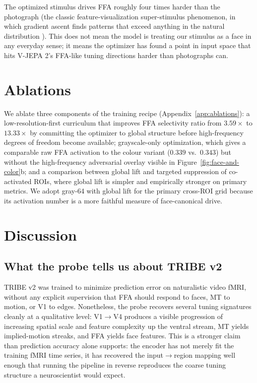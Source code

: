 \documentclass{article}
\begin{document}
The optimized stimulus drives FFA roughly four times harder than the photograph (the classic feature-visualization super-stimulus phenomenon, in which gradient ascent finds patterns that exceed anything in the natural distribution \citep{szegedy2013intriguing,goodfellow2014explaining,walker2019inception,bashivan2019neural}). This does not mean the model is treating our stimulus as a face in any everyday sense; it means the optimizer has found a point in input space that hits V-JEPA 2's FFA-like tuning directions harder than photographs can.

\section{Ablations}\label{sec:ablations}

We ablate three components of the training recipe (Appendix~\ref{app:ablations}): a low-resolution-first curriculum that improves FFA selectivity ratio from $3.59\times$ to $13.33\times$ by committing the optimizer to global structure before high-frequency degrees of freedom become available; grayscale-only optimization, which gives a comparable raw FFA activation to the colour variant ($0.339$ vs.\ $0.343$) but without the high-frequency adversarial overlay visible in Figure~\ref{fig:face-and-color}b; and a comparison between global lift and targeted suppression of co-activated ROIs, where global lift is simpler and empirically stronger on primary metrics. We adopt gray-64 with global lift for the primary cross-ROI grid because its activation number is a more faithful measure of face-canonical drive.

\section{Discussion}
\label{sec:discussion}

\subsection{What the probe tells us about TRIBE v2}
TRIBE v2 was trained to minimize prediction error on naturalistic video fMRI, without any explicit supervision that FFA should respond to faces, MT to motion, or V1 to edges. Nonetheless, the probe recovers several tuning signatures cleanly at a qualitative level: V1$\to$V4 produces a visible progression of increasing spatial scale and feature complexity up the ventral stream, MT yields implied-motion streaks, and FFA yields face features. This is a stronger claim than prediction accuracy alone supports: the encoder has not merely fit the training fMRI time series, it has recovered the input$\to$region mapping well enough that running the pipeline in reverse reproduces the coarse tuning structure a neuroscientist would expect.
\end{document}
